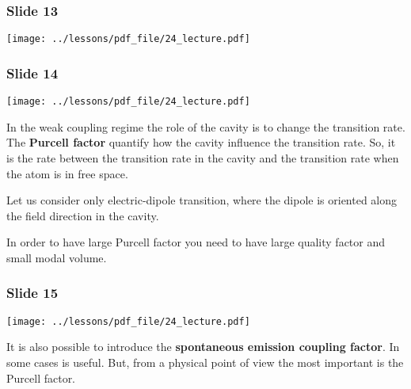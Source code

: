 \documentclass[../main/main.tex]{subfiles}
\begin{document}
\subsubsection*{Slide 13}

\begin{minipage}[]{0.5\linewidth}
\centering
\texttt{[image: ../lessons/pdf\_file/24\_lecture.pdf]}
\end{minipage}
\hspace{0.3cm}\vspace{0.3cm}
\begin{minipage}[c]{0.47\linewidth}

\end{minipage}

\subsubsection*{Slide 14}

\begin{minipage}[]{0.5\linewidth}
\centering
\texttt{[image: ../lessons/pdf\_file/24\_lecture.pdf]}
\end{minipage}
\hspace{0.3cm}\vspace{0.3cm}
\begin{minipage}[c]{0.47\linewidth}

In the weak coupling regime the role of the cavity is to change the transition rate. The \textbf{Purcell factor} quantify how the cavity influence the transition rate. So, it is the rate between the transition rate in the cavity and the transition rate when the atom is in free space.

Let us consider only electric-dipole transition, where the dipole is oriented along the field direction in the cavity.

In order to have large Purcell factor you need to have large quality factor and small modal volume.

\end{minipage}

\subsubsection*{Slide 15}

\begin{minipage}[]{0.5\linewidth}
\centering
\texttt{[image: ../lessons/pdf\_file/24\_lecture.pdf]}
\end{minipage}
\hspace{0.3cm}\vspace{0.3cm}
\begin{minipage}[c]{0.47\linewidth}

It is also possible to introduce the \textbf{spontaneous emission coupling factor}. In some cases is useful. But, from a physical point of view the most important is the Purcell factor.

\end{minipage}
\end{document}
